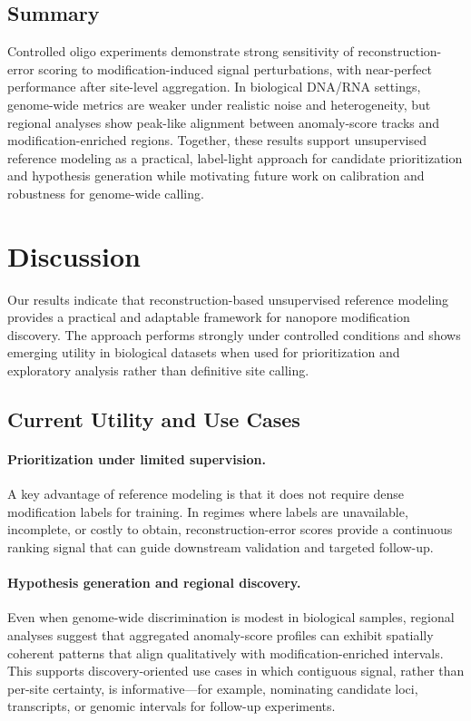 \documentclass[journal,article,submit,pdftex,moreauthors]{Definitions/mdpi}
\begin{document}
\subsection{Summary}
Controlled oligo experiments demonstrate strong sensitivity of reconstruction-error scoring to modification-induced signal perturbations, with near-perfect performance after site-level aggregation. In biological DNA/RNA settings, genome-wide metrics are weaker under realistic noise and heterogeneity, but regional analyses show peak-like alignment between anomaly-score tracks and modification-enriched regions. Together, these results support unsupervised reference modeling as a practical, label-light approach for candidate prioritization and hypothesis generation while motivating future work on calibration and robustness for genome-wide calling.

\section{Discussion}
Our results indicate that reconstruction-based unsupervised reference modeling provides a practical and adaptable framework for nanopore modification discovery. The approach performs strongly under controlled conditions and shows emerging utility in biological datasets when used for prioritization and exploratory analysis rather than definitive site calling.

\subsection{Current Utility and Use Cases}
\paragraph{Prioritization under limited supervision.}
A key advantage of reference modeling is that it does not require dense modification labels for training. In regimes where labels are unavailable, incomplete, or costly to obtain, reconstruction-error scores provide a continuous ranking signal that can guide downstream validation and targeted follow-up.

\paragraph{Hypothesis generation and regional discovery.}
Even when genome-wide discrimination is modest in biological samples, regional analyses suggest that aggregated anomaly-score profiles can exhibit spatially coherent patterns that align qualitatively with modification-enriched intervals. This supports discovery-oriented use cases in which contiguous signal, rather than per-site certainty, is informative—for example, nominating candidate loci, transcripts, or genomic intervals for follow-up experiments.
\end{document}
